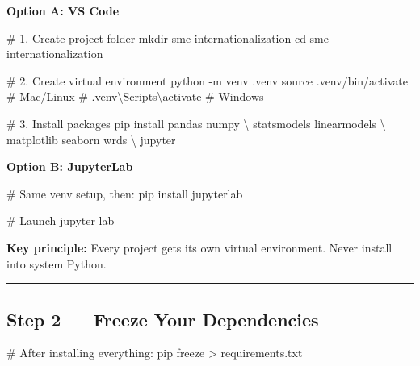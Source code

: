 \documentclass[
  letterpaper,
  DIV=11,
  numbers=noendperiod]{scrartcl}
\newenvironment{Shaded}{\begin{snugshade}}{\end{snugshade}}
\newcommand{\AttributeTok}[1]{\textcolor[rgb]{0.40,0.45,0.13}{#1}}
\newcommand{\BuiltInTok}[1]{\textcolor[rgb]{0.00,0.23,0.31}{#1}}
\newcommand{\CommentTok}[1]{\textcolor[rgb]{0.37,0.37,0.37}{#1}}
\newcommand{\DataTypeTok}[1]{\textcolor[rgb]{0.68,0.00,0.00}{#1}}
\newcommand{\ExtensionTok}[1]{\textcolor[rgb]{0.00,0.23,0.31}{#1}}
\newcommand{\FunctionTok}[1]{\textcolor[rgb]{0.28,0.35,0.67}{#1}}
\newcommand{\NormalTok}[1]{\textcolor[rgb]{0.00,0.23,0.31}{#1}}
\newcommand{\OperatorTok}[1]{\textcolor[rgb]{0.37,0.37,0.37}{#1}}
\begin{document}
\textbf{Option A: VS Code}

\begin{Shaded}
\begin{Highlighting}[]
\CommentTok{\# 1. Create project folder}
\FunctionTok{mkdir}\NormalTok{ sme{-}internationalization}
\BuiltInTok{cd}\NormalTok{ sme{-}internationalization}

\CommentTok{\# 2. Create virtual environment}
\ExtensionTok{python} \AttributeTok{{-}m}\NormalTok{ venv .venv}
\BuiltInTok{source}\NormalTok{ .venv/bin/activate   }\CommentTok{\# Mac/Linux}
\CommentTok{\# .venv\textbackslash{}Scripts\textbackslash{}activate    \# Windows}

\CommentTok{\# 3. Install packages}
\ExtensionTok{pip}\NormalTok{ install pandas numpy }\DataTypeTok{\textbackslash{}}
\NormalTok{  statsmodels linearmodels }\DataTypeTok{\textbackslash{}}
\NormalTok{  matplotlib seaborn wrds }\DataTypeTok{\textbackslash{}}
\NormalTok{  jupyter}
\end{Highlighting}
\end{Shaded}

\textbf{Option B: JupyterLab}

\begin{Shaded}
\begin{Highlighting}[]
\CommentTok{\# Same venv setup, then:}
\ExtensionTok{pip}\NormalTok{ install jupyterlab}

\CommentTok{\# Launch}
\ExtensionTok{jupyter}\NormalTok{ lab}
\end{Highlighting}
\end{Shaded}

\textbf{Key principle:} Every project gets its own virtual environment.
Never install into system Python.

\begin{center}\rule{0.5\linewidth}{0.5pt}\end{center}

\subsection{Step 2 --- Freeze Your
Dependencies}\label{step-2-freeze-your-dependencies}

\begin{Shaded}
\begin{Highlighting}[]
\CommentTok{\# After installing everything:}
\ExtensionTok{pip}\NormalTok{ freeze }\OperatorTok{\textgreater{}}\NormalTok{ requirements.txt}
\end{Highlighting}
\end{Shaded}
\end{document}

